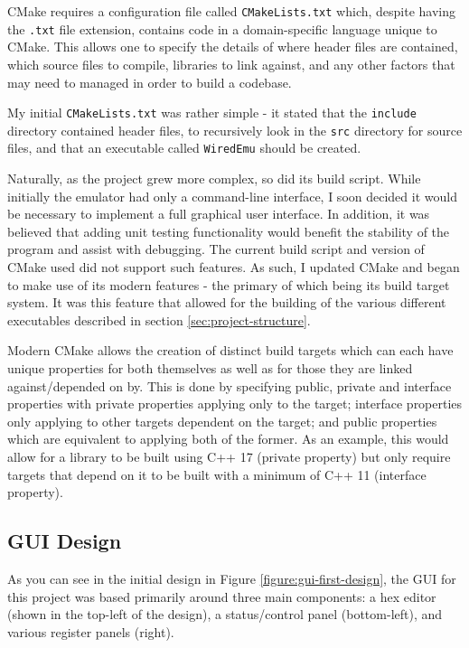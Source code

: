     CMake requires a configuration file called \texttt{CMakeLists.txt} which, despite having the \texttt{.txt} file extension, contains code in a domain-specific language unique to CMake. This allows one to specify the details of where header files are contained, which source files to compile, libraries to link against, and any other factors that may need to managed in order to build a codebase.

    My initial \texttt{CMakeLists.txt} was rather simple - it stated that the \texttt{include} directory contained header files, to recursively look in the \texttt{src} directory for source files, and that an executable called \texttt{WiredEmu} should be created.

    Naturally, as the project grew more complex, so did its build script. While initially the emulator had only a command-line interface, I soon decided it would be necessary to implement a full graphical user interface. In addition, it was believed that adding unit testing functionality would benefit the stability of the program and assist with debugging. The current build script and version of CMake used did not support such features. As such, I updated CMake and began to make use of its modern features - the primary of which being its build target system. It was this feature that allowed for the building of the various different executables described in section \ref{sec:project-structure}.

    Modern CMake allows the creation of distinct build targets which can each have unique properties for both themselves as well as for those they are linked against/depended on by. This is done by specifying public, private and interface properties with private properties applying only to the target; interface properties only applying to other targets dependent on the target; and public properties which are equivalent to applying both of the former. As an example, this would allow for a library to be built using C++ 17 (private property) but only require targets that depend on it to be built with a minimum of C++ 11 (interface property).


\subsection{GUI Design}
    \label{sec:gui-design}
    As you can see in the initial design in Figure \ref{figure:gui-first-design}, the GUI for this project was based primarily around three main components: a hex editor (shown in the top-left of the design), a status/control panel (bottom-left), and various register panels (right).

